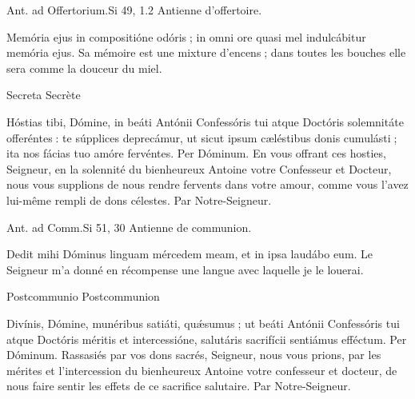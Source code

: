 \begin{paracol}{2}
Ant. ad Offertorium.\hfill Si 49, 1.2
\switchcolumn
Antienne d’offertoire.
\switchcolumn*

Memória ejus in compositióne odóris ; in omni ore quasi mel indulcábitur memória ejus.
\switchcolumn
Sa mémoire est une mixture d’encens ; dans toutes les bouches elle sera comme la douceur du miel.
\switchcolumn*

Secreta
\switchcolumn
Secrète
\switchcolumn*

Hóstias tibi, Dómine, in beáti  Antónii Confessóris tui atque Doctóris solemnitáte offeréntes : te súpplices deprecámur, ut sicut ipsum cæléstibus donis cumulásti ; ita nos fácias tuo amóre fervéntes. Per Dóminum.
\switchcolumn
En vous offrant ces hosties, Seigneur, en  la solennité du bienheureux Antoine votre Confesseur et Docteur, nous vous supplions de nous rendre fervents dans votre amour, comme vous l’avez lui-même rempli de dons célestes. Par Notre-Seigneur.
\switchcolumn*

Ant. ad Comm.\hfill Si 51, 30
\switchcolumn
Antienne de communion.
\switchcolumn*

Dedit mihi Dóminus linguam mércedem meam, et in ipsa laudábo eum.
\switchcolumn
Le Seigneur m’a donné en récompense une langue avec laquelle je le louerai.
\switchcolumn*

Postcommunio
\switchcolumn
Postcommunion
\switchcolumn*

Divínis, Dómine, munéribus satiáti,  quǽsumus ; ut beáti Antónii Confessóris tui atque Doctóris méritis et intercessióne, salutáris sacrifícii sentiámus efféctum. Per Dóminum.
\switchcolumn
Rassasiés par vos dons sacrés, Seigneur,  nous vous prions, par les mérites et l’intercession du bienheureux Antoine votre confesseur et docteur, de nous faire sentir les effets de ce sacrifice salutaire. Par Notre-Seigneur.
\switchcolumn*

\end{paracol}


